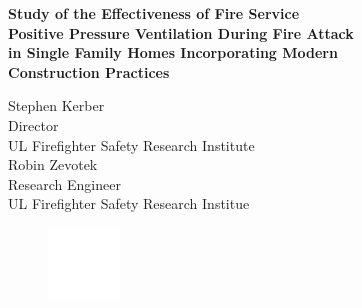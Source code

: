 \documentclass{article}
\begin{document}
	\begin{titlepage}
		
		\pagecolor{ULred}\afterpage{\nopagecolor}
		


			\vspace*{23\baselineskip} 

		\huge
		\begin{adjustwidth}{-0.5in}{-0in}
		\color{white}
		\textbf{Study of the Effectiveness of Fire Service \\ Positive Pressure Ventilation During Fire Attack \\ in Single Family Homes Incorporating Modern \\ Construction Practices\\}
		\end{adjustwidth}
		\begin{adjustwidth}{-0.5in}{}
		\color{white}
		\vspace{.3in}
		\large
		Stephen Kerber\\
		Director \\
		UL Firefighter Safety Research Institute \\
		\vspace*{\baselineskip}
		Robin Zevotek \\
		Research Engineer \\
		UL Firefighter Safety Research Institue \\ 
		\vspace*{\baselineskip}
		\vspace{.2in}
		\begin{figure}[h]
			\hspace*{-0.5in}\includegraphics[width=0.75in]{0_Images/Section_1/ULLogoWhite.pdf}
		\end{figure}
		\end{adjustwidth}
	\end{titlepage}
\end{document}

